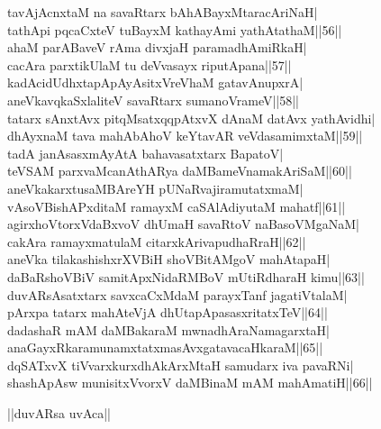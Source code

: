 \documentclass{article}
\begin{document}
tavAjAcnxtaM na savaRtarx bAhABayxMtaracAriNaH|\\
tathApi pqcaCxteV tuBayxM kathayAmi yathAtathaM||56||\\
ahaM parABaveV rAma divxjaH paramadhAmiRkaH|\\
cacAra parxtikUlaM tu deVvasayx riputApana||57||\\
kadAcidUdhxtapApAyAsitxVreVhaM gatavAnupxrA|\\
aneVkavqkaSxlaliteV savaRtarx sumanoVrameV||58||\\
tatarx sAnxtAvx pitqMsatxqqpAtxvX dAnaM datAvx yathAvidhi|\\
dhAyxnaM tava mahAbAhoV keYtavAR veVdasamimxtaM||59||\\
tadA janAsasxmAyAtA bahavasatxtarx BapatoV|\\
teVSAM parxvaMcanAthARya daMBameVnamakAriSaM||60||\\
aneVkakarxtusaMBAreYH pUNaRvajiramutatxmaM|\\
vAsoVBishAPxditaM ramayxM caSAlAdiyutaM mahatf||61||\\
agirxhoVtorxVdaBxvoV dhUmaH savaRtoV naBasoVMgaNaM|\\
cakAra ramayxmatulaM citarxkArivapudhaRraH||62||\\
aneVka tilakashishxrXVBiH shoVBitAMgoV mahAtapaH|\\
daBaRshoVBiV samitApxNidaRMBoV mUtiRdharaH kimu||63||\\
duvARsAsatxtarx savxcaCxMdaM parayxTanf jagatiVtalaM|\\
pArxpa tatarx mahAteVjA dhUtapApasasxritatxTeV||64||\\
dadashaR mAM daMBakaraM mwnadhAraNamagarxtaH|\\
anaGayxRkaramunamxtatxmasAvxgatavacaHkaraM||65||\\
dqSATxvX tiVvarxkurxdhAkArxMtaH samudarx iva pavaRNi|\\
shashApAsw munisitxVvorxV daMBinaM mAM mahAmatiH||66||\\

\begin{center}
||duvARsa uvAca||
\end{center}
\end{document}
